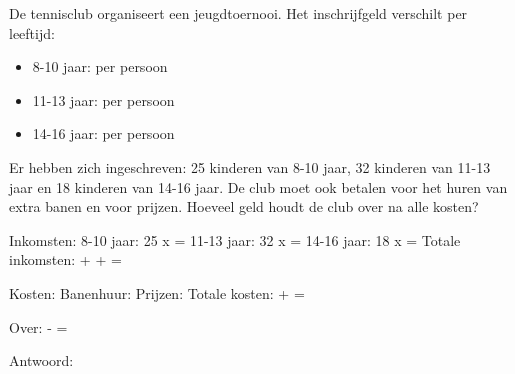 \begin{opgave}
De tennisclub organiseert een jeugdtoernooi. Het inschrijfgeld verschilt per leeftijd:

\begin{itemize}
\item 8-10 jaar:  per persoon
\item 11-13 jaar:  per persoon
\item 14-16 jaar:  per persoon
\end{itemize}

Er hebben zich ingeschreven: 25 kinderen van 8-10 jaar, 32 kinderen van 11-13 jaar
en 18 kinderen van 14-16 jaar. De club moet ook  betalen voor het
huren van extra banen en  voor prijzen. Hoeveel geld houdt de club
over na alle kosten?
\end{opgave}

\begin{oplossing}
Inkomsten:
8-10 jaar: 25 x  = 
11-13 jaar: 32 x  = 
14-16 jaar: 18 x  = 
Totale inkomsten:  +  +  = 

Kosten:
Banenhuur: 
Prijzen: 
Totale kosten:  +  = 

Over:  -  = 

Antwoord: 
\end{oplossing}